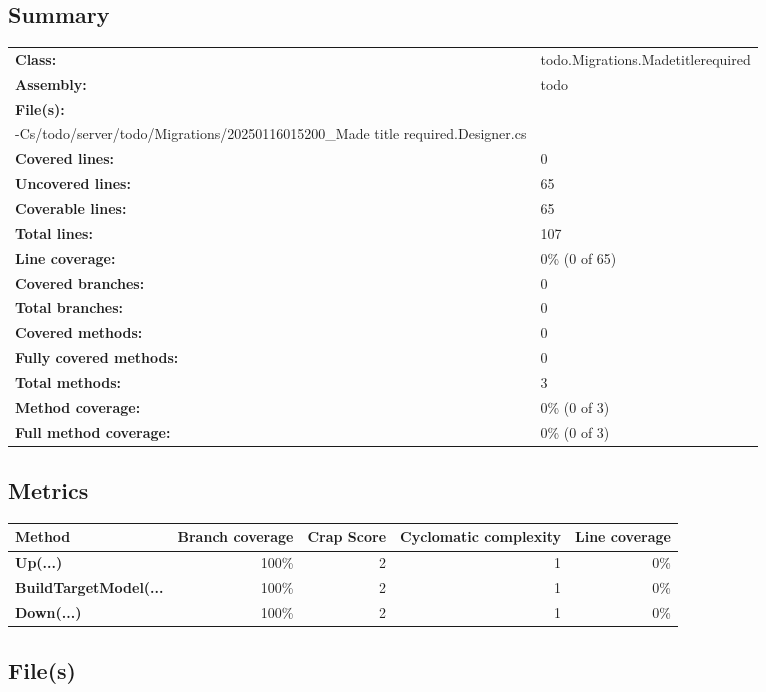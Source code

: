 \documentclass[a4paper,landscape,10pt]{article}
\begin{document}
\subsection{Summary}
\begin{longtable}[l]{ll}
\textbf{Class:} & todo.Migrations.Madetitlerequired\\
\textbf{Assembly:} & todo\\
\textbf{File(s):} & \begin{minipage}[t]{12cm}{rojects/4-Cs/todo/server/todo/Migrations/20250116015200\_Made title required.cs\\-Cs/todo/server/todo/Migrations/20250116015200\_Made title required.Designer.cs}\end{minipage} \\
\textbf{Covered lines:} & 0\\
\textbf{Uncovered lines:} & 65\\
\textbf{Coverable lines:} & 65\\
\textbf{Total lines:} & 107\\
\textbf{Line coverage:} & 0\% (0 of 65)\\
\textbf{Covered branches:} & 0\\
\textbf{Total branches:} & 0\\
\textbf{Covered methods:} & 0\\
\textbf{Fully covered methods:} & 0\\
\textbf{Total methods:} & 3\\
\textbf{Method coverage:} & 0\% (0 of 3)\\
\textbf{Full method coverage:} & 0\% (0 of 3)\\
\end{longtable}
\subsection{Metrics}
\begin{longtable}[l]{|l|r|r|r|r|}
\hline
\textbf{Method} & \textbf{Branch coverage} & \textbf{Crap Score} & \textbf{Cyclomatic complexity} & \textbf{Line coverage}\\
\hline
\textbf{Up(...)} & 100\% & 2 & 1 & 0\%\\
\hline
\textbf{BuildTargetModel(...} & 100\% & 2 & 1 & 0\%\\
\hline
\textbf{Down(...)} & 100\% & 2 & 1 & 0\%\\
\hline
\end{longtable}
\subsection{File(s)}
\end{document}
